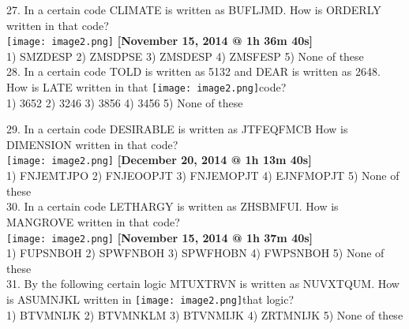 \documentclass[
]{article}
\begin{document}
27. In a certain code CLIMATE is written as BUFLJMD. How is ORDERLY written in that code?\\
\texttt{[image: image2.png]}
\textbf{[November 15, 2014 @ 1h 36m 40s]}\\
1) SMZDESP \hspace{2mm}2) ZMSDPSE \hspace{2mm}3) ZMSDESP \hspace{2mm}4) ZMSFESP \hspace{2mm}5) None of these\\

28. In a certain code TOLD is written as 5132 and DEAR is written as 2648. How is LATE
written in that \texttt{[image: image2.png]}code?\\
1) 3652 \hspace{2mm}2) 3246 \hspace{2mm}3) 3856 \hspace{2mm}4) 3456 \hspace{2mm}5) None of these

29. In a certain code DESIRABLE is written as JTFEQFMCB How is DIMENSION written in that
code?\\\texttt{[image: image2.png]}
\textbf{[December 20, 2014 @ 1h 13m 40s]}\\
1) FNJEMTJPO \hspace{2mm}2) FNJEOOPJT \hspace{2mm}3) FNJEMOPJT \hspace{2mm}4) EJNFMOPJT \hspace{2mm}5) None of these\\

30. In a certain code LETHARGY is written as ZHSBMFUI. How is MANGROVE written in that
code?\\
\texttt{[image: image2.png]}
\textbf{[November 15, 2014 @ 1h 37m 40s]}\\
1) FUPSNBOH \hspace{2mm}2) SPWFNBOH \hspace{2mm}3) SPWFHOBN \hspace{2mm}4) FWPSNBOH \hspace{2mm}5) None of these\\

31. By the following certain logic MTUXTRVN is written as NUVXTQUM. How is ASUMNJKL
written in \texttt{[image: image2.png]}that logic?\\
1) BTVMNIJK \hspace{2mm}2) BTVMNKLM \hspace{2mm}3) BTVNMIJK \hspace{2mm}4) ZRTMNIJK \hspace{2mm}5) None of these\\
\end{document}
